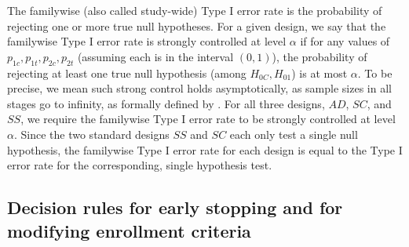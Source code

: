 \documentclass[article]{jss}
\begin{document}
The familywise (also called study-wide) Type I error rate is the probability of rejecting one or more true null hypotheses.
For a given design, we say that the familywise Type I error rate is strongly controlled at level $α$ if 
for any values of  $p_{1c},p_{1t},p_{2c},p_{2t}$ (assuming each is in the interval $(0,1)$), 
the probability of rejecting at least one true null hypothesis (among $H_{0C}, H_{01}$) is at most $α$. To be precise, we mean such strong control holds asymptotically, as sample sizes in all stages go to infinity, as formally defined by \cite{Rosenblum2013AdaptMISTIE}. %
For all three designs, $AD$, $SC$, and $SS$, we require the familywise Type I error rate to be strongly controlled at level $α$. 
Since the two standard designs $SS$ and $SC$ each only test a single null hypothesis, the familywise Type I error rate for each design is equal to the  Type I error rate for the corresponding, single hypothesis test.




\subsection{Decision rules for early stopping and for modifying enrollment criteria}
\label{sub:decisionRules}
\end{document}
